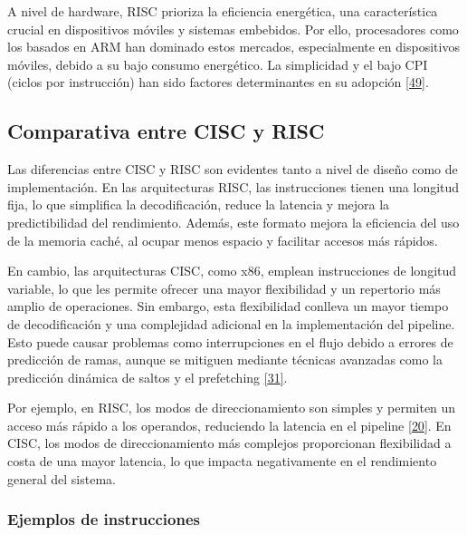 \documentclass[12pt,oneside]{templates/unerthesis}
\begin{document}
A nivel de hardware, RISC prioriza la eficiencia energética, una característica crucial en dispositivos móviles y sistemas embebidos. Por ello, procesadores como los basados en ARM han dominado estos mercados, especialmente en dispositivos móviles, debido a su bajo consumo energético. La simplicidad y el bajo CPI (ciclos por instrucción) han sido factores determinantes en su adopción \protect\hyperlink{ref-hennessy2017computer_riscv}{{[}49{]}}.

\hypertarget{comparativa-entre-cisc-y-risc}{%
\subsection{Comparativa entre CISC y RISC}\label{comparativa-entre-cisc-y-risc}}

Las diferencias entre CISC y RISC son evidentes tanto a nivel de diseño como de implementación. En las arquitecturas RISC, las instrucciones tienen una longitud fija, lo que simplifica la decodificación, reduce la latencia y mejora la predictibilidad del rendimiento. Además, este formato mejora la eficiencia del uso de la memoria caché, al ocupar menos espacio y facilitar accesos más rápidos.

En cambio, las arquitecturas CISC, como x86, emplean instrucciones de longitud variable, lo que les permite ofrecer una mayor flexibilidad y un repertorio más amplio de operaciones. Sin embargo, esta flexibilidad conlleva un mayor tiempo de decodificación y una complejidad adicional en la implementación del pipeline. Esto puede causar problemas como interrupciones en el flujo debido a errores de predicción de ramas, aunque se mitiguen mediante técnicas avanzadas como la predicción dinámica de saltos y el prefetching \protect\hyperlink{ref-tanenbaum_structured_2016}{{[}31{]}}.

Por ejemplo, en RISC, los modos de direccionamiento son simples y permiten un acceso más rápido a los operandos, reduciendo la latencia en el pipeline \protect\hyperlink{ref-stallings_computer_2021}{{[}20{]}}. En CISC, los modos de direccionamiento más complejos proporcionan flexibilidad a costa de una mayor latencia, lo que impacta negativamente en el rendimiento general del sistema.

\hypertarget{ejemplos-de-instrucciones}{%
\subsubsection{Ejemplos de instrucciones}\label{ejemplos-de-instrucciones}}
\end{document}
